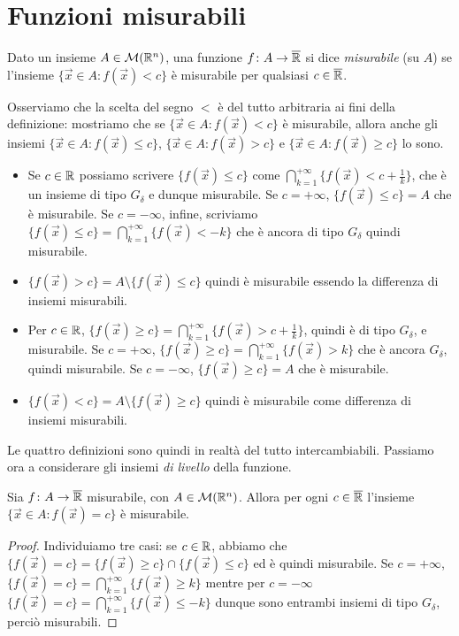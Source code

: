 \section{Funzioni misurabili}
\label{sec:funzioni-misurabili}
\begin{definizione} \label{d:funzione-misurabile}
	Dato un insieme $A\in\mathcal M(\mathbb{R}^n)$, una funzione $f\colon A\to\overline{\mathbb{R}}$ si dice \emph{misurabile} (su $A$) se l'insieme $\{\vec x\in A\colon f(\vec x)<c\}$ è misurabile per qualsiasi $c\in\overline{\mathbb{R}}$.
\end{definizione}
Osserviamo che la scelta del segno $<$ è del tutto arbitraria ai fini della definizione: mostriamo che se $\{\vec x\in A\colon f(\vec x)<c\}$ è misurabile, allora anche gli insiemi $\{\vec x\in A\colon f(\vec x)\leq c\}$, $\{\vec x\in A\colon f(\vec x)>c\}$ e $\{\vec x\in A\colon f(\vec x)\geq c\}$ lo sono.
\begin{itemize}
	\item Se $c\in\mathbb{R}$ possiamo scrivere $\{f(\vec x)\leq c\}$ come $\bigcap_{k=1}^{+\infty}\{f(\vec x)<c+\frac1{k}\}$, che è un insieme di tipo $G_\delta$ e dunque misurabile.
		Se $c=+\infty$, $\{f(\vec x)\leq c\}=A$ che è misurabile.
		Se $c=-\infty$, infine, scriviamo $\{f(\vec x)\leq c\}=\bigcap_{k=1}^{+\infty}\{f(\vec x)<-k\}$ che è ancora di tipo $G_\delta$ quindi misurabile.
	\item $\{f(\vec x)>c\}=A\setminus\{f(\vec x)\leq c\}$ quindi è misurabile essendo la differenza di insiemi misurabili.
	\item Per $c\in\mathbb{R}$, $\{f(\vec x)\geq c\}=\bigcap_{k=1}^{+\infty}\{f(\vec x)>c+\frac1{k}\}$, quindi è di tipo $G_\delta$, e misurabile.
		Se $c=+\infty$, $\{f(\vec x)\geq c\}=\bigcap_{k=1}^{+\infty}\{f(\vec x)>k\}$ che è ancora $G_\delta$, quindi misurabile.
		Se $c=-\infty$, $\{f(\vec x)\geq c\}=A$ che è misurabile.
	\item $\{f(\vec x)<c\}=A\setminus\{f(\vec x)\geq c\}$ quindi è misurabile come differenza di insiemi misurabili.
\end{itemize}
Le quattro definizioni sono quindi in realtà del tutto intercambiabili.
Passiamo ora a considerare gli insiemi \emph{di livello} della funzione.
\begin{teorema} \label{t:insiemi-livello-funzione-misurabile}
	Sia $f\colon A\to\overline{\mathbb{R}}$ misurabile, con $A\in\mathcal M(\mathbb{R}^n)$.
	Allora per ogni $c\in\overline{\mathbb{R}}$ l'insieme $\{\vec x\in A\colon f(\vec x)=c\}$ è misurabile.
\end{teorema}
\begin{proof}
	Individuiamo tre casi: se $c\in\mathbb{R}$, abbiamo che $\{f(\vec x)=c\}=\{f(\vec x)\geq c\}\cap\{f(\vec x)\leq c\}$ ed è quindi misurabile.
	Se $c=+\infty$, $\{f(\vec x)=c\}=\bigcap_{k=1}^{+\infty}\{f(\vec x)\geq k\}$ mentre per $c=-\infty$ $\{f(\vec x)=c\}=\bigcap_{k=1}^{+\infty}\{f(\vec x)\leq -k\}$ dunque sono entrambi insiemi di tipo $G_\delta$, perciò misurabili.
\end{proof}
